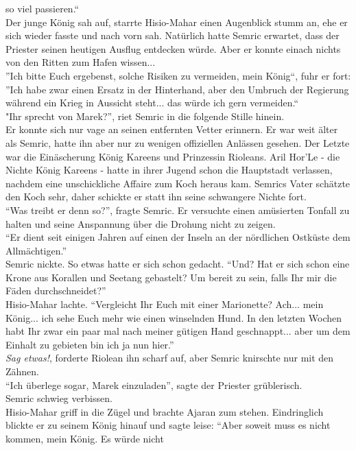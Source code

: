 so viel passieren.``\\
Der junge König sah auf, starrte Hisio-Mahar einen Augenblick stumm an, ehe er sich wieder fasste 
und nach vorn sah. Natürlich hatte Semric erwartet, dass der Priester seinen heutigen Ausflug 
entdecken würde. Aber er konnte einach nichts von den Ritten zum Hafen wissen... \\
''Ich bitte Euch ergebenst, solche Risiken zu vermeiden, mein König``, fuhr er fort: ''Ich habe 
zwar einen Ersatz in der Hinterhand, aber den Umbruch der Regierung während ein Krieg in 
Aussicht steht... das würde ich gern vermeiden.``\\
"Ihr sprecht von Marek?'', riet Semric in die folgende Stille hinein.\\
Er konnte sich nur vage an seinen entfernten Vetter erinnern. Er war weit älter als Semric, hatte 
ihn aber nur zu wenigen offiziellen Anlässen gesehen. Der Letzte war die Einäscherung König Kareens 
und Prinzessin Rioleans. Aril Hor'Le - die Nichte König Kareens - hatte in ihrer Jugend schon die 
Hauptstadt verlassen, nachdem eine unschickliche Affaire zum Koch heraus kam. Semrics Vater 
schätzte den Koch sehr, daher schickte er statt ihn seine schwangere Nichte fort.\\
``Was treibt er denn so?'', fragte Semric. Er versuchte einen amüsierten Tonfall zu halten und 
seine Anspannung über die Drohung nicht zu zeigen.\\
``Er dient seit einigen Jahren auf einen der Inseln an der nördlichen Ostküste dem Allmächtigen.''\\
Semric nickte. So etwas hatte er sich schon gedacht. ``Und? Hat er sich schon eine Krone aus 
Korallen und Seetang gebastelt? Um bereit zu sein, falls Ihr mir die Fäden durchschneidet?''\\
Hisio-Mahar lachte. ``Vergleicht Ihr Euch mit einer Marionette? Ach... mein König... ich sehe Euch 
mehr wie einen winselnden Hund. In den letzten Wochen habt Ihr zwar ein paar mal nach meiner 
gütigen Hand geschnappt... aber um dem Einhalt zu gebieten bin ich ja nun hier.''\\
\textit{Sag etwas!}, forderte Riolean ihn scharf auf, aber Semric knirschte nur mit den Zähnen.\\
``Ich überlege sogar, Marek einzuladen'', sagte der Priester grüblerisch.\\
Semric schwieg verbissen.\\
Hisio-Mahar griff in die Zügel und brachte Ajaran zum stehen. Eindringlich blickte er zu seinem 
König hinauf und sagte leise: ``Aber soweit muss es nicht kommen, mein König. Es würde nicht 
